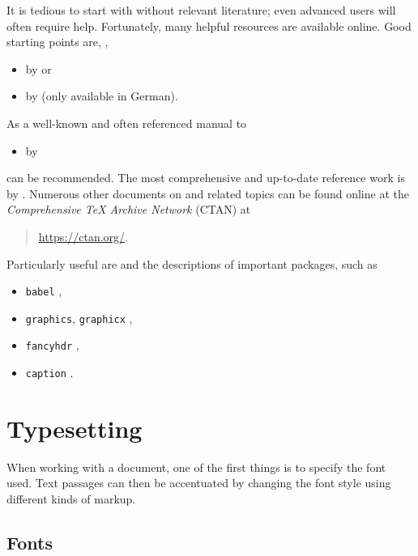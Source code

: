 It is tedious to start with \latex without relevant literature; even advanced
users will often require help. Fortunately, many helpful resources are available
online. Good starting points are, \eg,
%
\begin{itemize}
    \item {} by \textcite{Oetiker2021} or
	\item {} by \textcite{Daniel2018} (only available in German).

\end{itemize}
%
\noindent
As a well-known and often referenced manual to \latex 
%
\begin{itemize}
    \item {} by \textcite{Kopka2003}
\end{itemize}
%
can be recommended. The most comprehensive and up-to-date reference work is
 by \textcite{Mittelbach2023}. Numerous other
documents on \latex and related topics can be
found online at the \emph{Comprehensive TeX Archive Network} (CTAN) at
%
\begin{quote}
    \url{https://ctan.org/}.
\end{quote}
%
Particularly useful are  \cite{Pakin2026} and the
descriptions of important \latex packages, such as
%
\begin{itemize}
    \item[] \texttt{babel} \cite{Bezos2026},
    \item[] \texttt{graphics}, \texttt{graphicx} \cite{Carlisle2026},
    \item[] \texttt{fancyhdr} \cite{Oostrum2025},
    \item[] \texttt{caption} \cite{Sommerfeldt2023}.
\end{itemize}


\section{Typesetting}

When working with a \latex document, one of the first things is to specify the
font used. Text passages can then be accentuated by changing the font style
using different kinds of markup.

\subsection{Fonts}
\label{sec:fonts}

